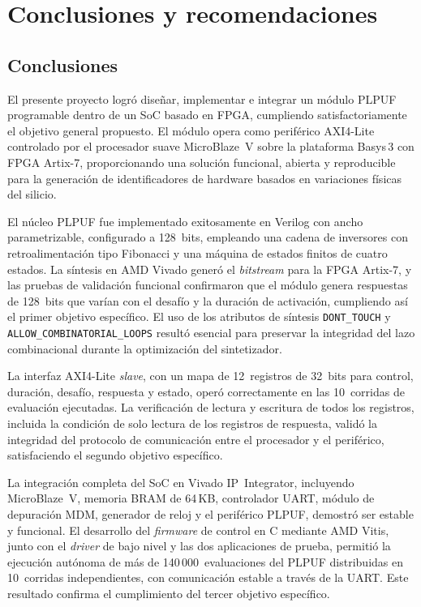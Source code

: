 
\chapter{Conclusiones y recomendaciones}
\label{ch:conclusiones}

\section{Conclusiones}

El presente proyecto logró diseñar, implementar e integrar un módulo PLPUF
programable dentro de un SoC basado en FPGA, cumpliendo satisfactoriamente
el objetivo general propuesto. El módulo opera como periférico AXI4-Lite
controlado por el procesador suave MicroBlaze~V sobre la plataforma Basys\,3
con FPGA Artix-7, proporcionando una solución funcional, abierta y
reproducible para la generación de identificadores de hardware basados en
variaciones físicas del silicio.

El núcleo PLPUF fue implementado exitosamente en Verilog con ancho
parametrizable, configurado a 128~bits, empleando una cadena de inversores con
retroalimentación tipo Fibonacci y una máquina de estados finitos de cuatro
estados. La síntesis en AMD Vivado generó el \textit{bitstream} para la FPGA
Artix-7, y las pruebas de validación funcional confirmaron que el módulo
genera respuestas de 128~bits que varían con el desafío y la duración de
activación, cumpliendo así el primer objetivo específico. El uso de los
atributos de síntesis \texttt{DONT\_TOUCH} y
\texttt{ALLOW\_COMBINATORIAL\_LOOPS} resultó esencial para preservar la
integridad del lazo combinacional durante la optimización del sintetizador.

La interfaz AXI4-Lite \textit{slave}, con un mapa de 12~registros de 32~bits
para control, duración, desafío, respuesta y estado, operó correctamente en
las 10~corridas de evaluación ejecutadas. La verificación de lectura y
escritura de todos los registros, incluida la condición de solo lectura de los
registros de respuesta, validó la integridad del protocolo de comunicación
entre el procesador y el periférico, satisfaciendo el segundo objetivo
específico.

La integración completa del SoC en Vivado IP~Integrator, incluyendo
MicroBlaze~V, memoria BRAM de 64\,KB, controlador UART, módulo de depuración
MDM, generador de reloj y el periférico PLPUF, demostró ser estable y
funcional. El desarrollo del \textit{firmware} de control en C mediante AMD
Vitis, junto con el \textit{driver} de bajo nivel y las dos aplicaciones de
prueba, permitió la ejecución autónoma de más de 140\,000~evaluaciones del
PLPUF distribuidas en 10~corridas independientes, con comunicación estable a
través de la UART. Este resultado confirma el cumplimiento del tercer
objetivo específico.


